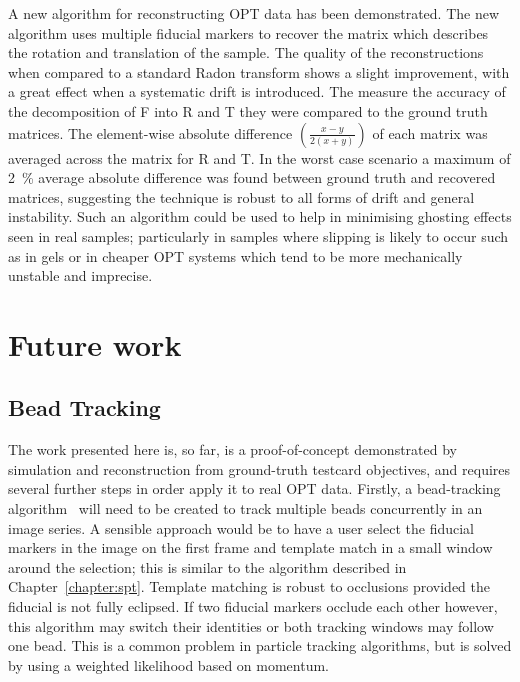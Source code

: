 A new algorithm for reconstructing OPT data has been demonstrated.
The new algorithm uses multiple fiducial markers to recover the matrix which describes the rotation and translation of the sample.
The quality of the reconstructions when compared to a standard \gls{Radon transform} shows a slight improvement, with a great effect when a systematic drift is introduced.
The measure the accuracy of the decomposition of \gls{F} into \gls{R} and \gls{T} they were compared to the ground truth matrices.
The element-wise absolute difference \(\left(\frac{x-y}{2(x+y)}\right)\) of each matrix was averaged across the matrix for \gls{R} and \gls{T}.
In the worst case scenario a maximum of \SI{2}{\percent} average absolute difference was found between ground truth and recovered matrices,
suggesting the technique is robust to all forms of drift and general instability.
Such an algorithm could be used to help in minimising ghosting effects seen in real samples; particularly in samples where slipping is likely to occur such as in gels or in cheaper \gls{OPT} systems which tend to be more mechanically unstable and imprecise.

\section{Future work}

\subsection{Bead Tracking}
The work presented here is, so far, is a proof-of-concept demonstrated by simulation and reconstruction from ground-truth testcard objectives, and requires several further steps in order apply it to real \gls{OPT} data.
Firstly, a bead-tracking algorithm~\cite{crockerMethodsDigitalVideo1996} will need to be created to track multiple beads concurrently in an image series.
A sensible approach would be to have a user select the fiducial markers in the image on the first frame and template match in a small window around the selection; this is similar to the algorithm described in Chapter~\ref{chapter:spt}.
Template matching is robust to occlusions provided the fiducial is not fully eclipsed.
If two fiducial markers occlude each other however, this algorithm may switch their identities or both tracking windows may follow one bead.
This is a common problem in particle tracking algorithms, but is solved by using a weighted likelihood based on momentum\cite{chenouardMultipleHypothesisTracking2013}.

